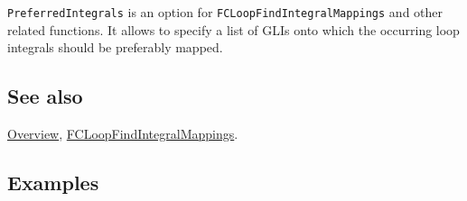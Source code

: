 \documentclass[../FeynCalcManual.tex]{subfiles}
\begin{document}
\texttt{PreferredIntegrals} is an option for
\texttt{FCLoopFindIntegralMappings} and other related functions. It
allows to specify a list of GLIs onto which the occurring loop integrals
should be preferably mapped.

\subsection{See also}

\hyperlink{toc}{Overview},
\hyperlink{fcloopfindintegralmappings}{FCLoopFindIntegralMappings}.

\subsection{Examples}
\end{document}
